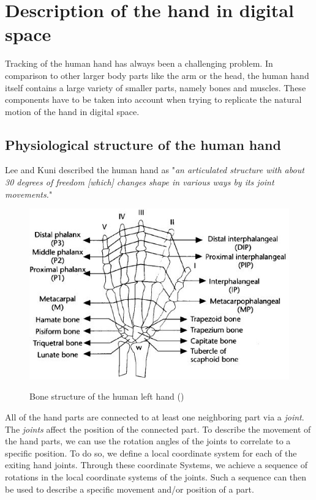 
\chapter{Description of the hand in digital space}
\label{sec:Description_of_hand_in_digital_space}
Tracking of the human hand has always been a challenging problem. In comparison to other larger body parts like the arm or the head, the human hand itself contains a large variety of smaller parts, namely bones and muscles. These components have to be taken into account when trying to replicate the natural motion of the hand in digital space.
\section{Physiological structure of the human hand}
\label{sec:Physiological_structure_of_the_human_hand}
Lee and Kuni \citep{LEE.1995} described the human hand as "\textit{an articulated structure with about 30 degrees of freedom [which] changes shape in various ways by its joint movements.}"
\begin{figure}[H]

	\includegraphics[width=\textwidth]{images/hand.jpg}
	\label{Handstructure} 
	\caption{Bone structure of the human left hand (\cite{LEE.1995})}
\end{figure}
All of the hand parts are connected to at least one neighboring part via a \textit{joint}. The \textit{joints} affect the position of the connected part. To describe the movement of the hand parts, we can use the rotation angles of the joints to correlate to a specific position.
To do so, we define a local coordinate system for each of the exiting hand joints. Through these coordinate Systems, we achieve a sequence of rotations in the local coordinate systems of the joints. Such a sequence can then be used to describe a specific movement and/or position of a part.
